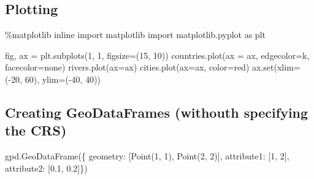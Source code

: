 \documentclass[
  letterpaper,
  DIV=11,
  numbers=noendperiod]{scrreprt}
\newenvironment{Shaded}{\begin{snugshade}}{\end{snugshade}}
\newcommand{\BuiltInTok}[1]{\textcolor[rgb]{0.00,0.23,0.31}{#1}}
\newcommand{\DecValTok}[1]{\textcolor[rgb]{0.68,0.00,0.00}{#1}}
\newcommand{\FloatTok}[1]{\textcolor[rgb]{0.68,0.00,0.00}{#1}}
\newcommand{\ImportTok}[1]{\textcolor[rgb]{0.00,0.46,0.62}{#1}}
\newcommand{\NormalTok}[1]{\textcolor[rgb]{0.00,0.23,0.31}{#1}}
\newcommand{\OperatorTok}[1]{\textcolor[rgb]{0.37,0.37,0.37}{#1}}
\newcommand{\StringTok}[1]{\textcolor[rgb]{0.13,0.47,0.30}{#1}}
\begin{document}
\subsection{Plotting}\label{plotting}

\begin{Shaded}
\begin{Highlighting}[]
\OperatorTok{\%}\NormalTok{matplotlib inline}
\ImportTok{import}\NormalTok{ matplotlib}
\ImportTok{import}\NormalTok{ matplotlib.pyplot }\ImportTok{as}\NormalTok{ plt}

\NormalTok{fig, ax }\OperatorTok{=}\NormalTok{ plt.subplots(}\DecValTok{1}\NormalTok{, }\DecValTok{1}\NormalTok{, figsize}\OperatorTok{=}\NormalTok{(}\DecValTok{15}\NormalTok{, }\DecValTok{10}\NormalTok{))}
\NormalTok{countries.plot(ax }\OperatorTok{=}\NormalTok{ ax, edgecolor}\OperatorTok{=}\StringTok{\textquotesingle{}k\textquotesingle{}}\NormalTok{, facecolor}\OperatorTok{=}\StringTok{\textquotesingle{}none\textquotesingle{}}\NormalTok{)}
\NormalTok{rivers.plot(ax}\OperatorTok{=}\NormalTok{ax)}
\NormalTok{cities.plot(ax}\OperatorTok{=}\NormalTok{ax, color}\OperatorTok{=}\StringTok{\textquotesingle{}red\textquotesingle{}}\NormalTok{)}
\NormalTok{ax.}\BuiltInTok{set}\NormalTok{(xlim}\OperatorTok{=}\NormalTok{(}\OperatorTok{{-}}\DecValTok{20}\NormalTok{, }\DecValTok{60}\NormalTok{), ylim}\OperatorTok{=}\NormalTok{(}\OperatorTok{{-}}\DecValTok{40}\NormalTok{, }\DecValTok{40}\NormalTok{))}
\end{Highlighting}
\end{Shaded}

\subsection{Creating GeoDataFrames (withouth specifying the
CRS)}\label{creating-geodataframes-withouth-specifying-the-crs}

\begin{Shaded}
\begin{Highlighting}[]
\NormalTok{gpd.GeoDataFrame(\{}
    \StringTok{\textquotesingle{}geometry\textquotesingle{}}\NormalTok{: [Point(}\DecValTok{1}\NormalTok{, }\DecValTok{1}\NormalTok{), Point(}\DecValTok{2}\NormalTok{, }\DecValTok{2}\NormalTok{)],}
    \StringTok{\textquotesingle{}attribute1\textquotesingle{}}\NormalTok{: [}\DecValTok{1}\NormalTok{, }\DecValTok{2}\NormalTok{],}
    \StringTok{\textquotesingle{}attribute2\textquotesingle{}}\NormalTok{: [}\FloatTok{0.1}\NormalTok{, }\FloatTok{0.2}\NormalTok{]\})}
\end{Highlighting}
\end{Shaded}
\end{document}
